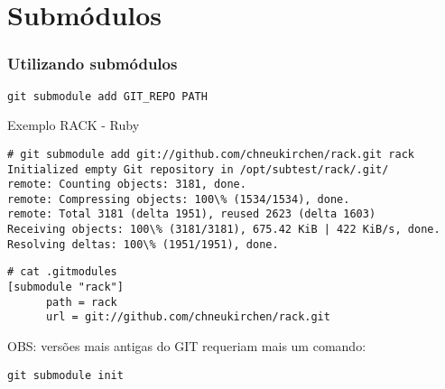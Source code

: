 \section{Submódulos}

\begin{frame}[fragile]
\frametitle{Utilizando submódulos}

\begin{verbatim}
git submodule add GIT_REPO PATH
\end{verbatim}

Exemplo RACK - Ruby

\scriptsize
\begin{verbatim}
# git submodule add git://github.com/chneukirchen/rack.git rack
Initialized empty Git repository in /opt/subtest/rack/.git/
remote: Counting objects: 3181, done.
remote: Compressing objects: 100\% (1534/1534), done.
remote: Total 3181 (delta 1951), reused 2623 (delta 1603)
Receiving objects: 100\% (3181/3181), 675.42 KiB | 422 KiB/s, done.
Resolving deltas: 100\% (1951/1951), done.
\end{verbatim}
\normalsize

\scriptsize
\begin{verbatim}
# cat .gitmodules 
[submodule "rack"]
      path = rack
      url = git://github.com/chneukirchen/rack.git
\end{verbatim}

OBS: versões mais antigas do GIT requeriam mais um comando:

\scriptsize
\begin{verbatim}
git submodule init
\end{verbatim}
\normalsize
\end{frame}
\normalsize


